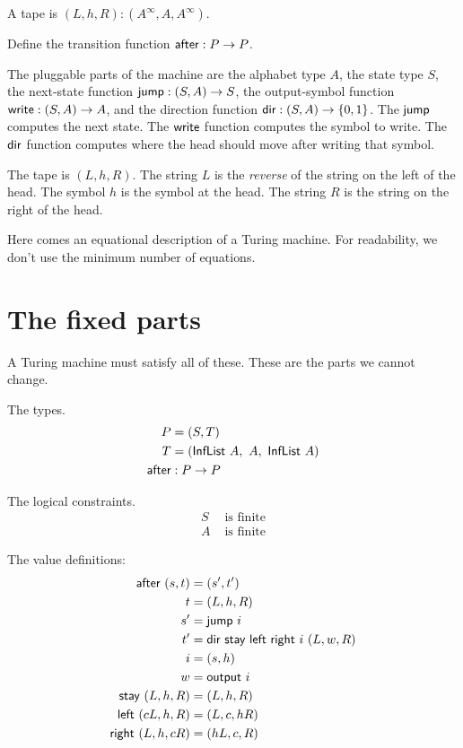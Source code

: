 A tape is \((L,h,R) : (A^\infty,A,A^\infty)\).

Define the transition function \(\textsf{after} : P \to P\).

The pluggable parts of the machine are
the alphabet type \(A\),
the state type \(S\),
the next-state function \(\textsf{jump} : (S,A) \to S\),
the output-symbol function \(\textsf{write} : (S,A) \to A\),
and the direction function \(\textsf{dir} : (S,A) \to \{0,1\}\).
The \(\textsf{jump}\) computes the next state.
The \(\textsf{write}\) function computes the symbol to write.
The \(\textsf{dir}\) function computes where the head should move after writing that symbol.

The tape is \((L,h,R)\).
The string \(L\) is the \emph{reverse} of the string on the left of the head.
The symbol \(h\) is the symbol at the head.
The string \(R\) is the string on the right of the head.

Here comes an equational description of a Turing machine.
For readability, we don't use the minimum number of equations.

\section{The fixed parts}

A Turing machine must satisfy all of these.
These are the parts we cannot change.

The types.
\begin{align}
    P &= (S,T)
    \\
    T &= (\textsf{InfList}~A, ~ A, ~ \textsf{InfList}~A)
    \\
    \textsf{after} &: P \to P
\end{align}

The logical constraints.
\begin{align}
    S &\text{ is finite}
    \\
    A &\text{ is finite}
\end{align}

The value definitions:
\begin{align}
    \textsf{after}~(s,t) &= (s',t')
    \\
    t &= (L,h,R)
    \\
    s' &= \textsf{jump}~i
    \\
    t' &= \textsf{dir}~\textsf{stay}~\textsf{left}~\textsf{right}~i~(L,w,R)
    \\
    i &= (s,h)
    \\
    w &= \textsf{output}~i
    \\
    \textsf{stay}~(L,h,R) &= (L,h,R)
    \\
    \textsf{left}~(cL,h,R) &= (L,c,hR)
    \\
    \textsf{right}~(L,h,cR) &= (hL,c,R)
\end{align}

